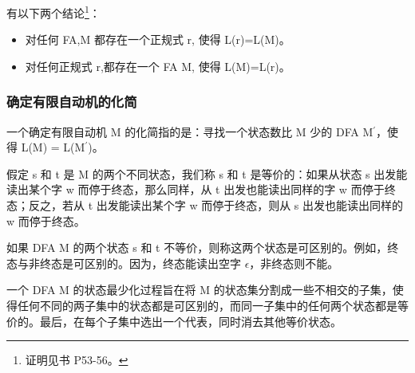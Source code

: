 有以下两个结论\footnote{证明见书 P53-56。}：
\begin{itemize}
    \item 对任何 FA,M 都存在一个正规式 r, 使得 L(r)=L(M)。
    \item 对任何正规式 r,都存在一个 FA M, 使得 L(M)=L(r)。
\end{itemize}

\subsubsection{确定有限自动机的化简}

一个确定有限自动机 M 的化简指的是：寻找一个状态数比 M 少的 DFA M$^{'}$，使得 L(M) = L(M$^{'}$)。

假定 s 和 t 是 M 的两个不同状态，我们称 s 和 t 是等价的：如果从状态 s 出发能读出某个字 w 而停于终态，那么同样，从 t 出发也能读出同样的字 w 而停于终态；反之，若从 t 出发能读出某个字 w 而停于终态，则从 s 出发也能读出同样的 w 而停于终态。

如果 DFA M 的两个状态 s 和 t 不等价，则称这两个状态是可区别的。例如，终态与非终态是可区别的。因为，终态能读出空字 $\epsilon$，非终态则不能。

一个 DFA M 的状态最少化过程旨在将 M 的状态集分割成一些不相交的子集，使得任何不同的两子集中的状态都是可区别的，而同一子集中的任何两个状态都是等价的。最后，在每个子集中选出一个代表，同时消去其他等价状态。


\newpage